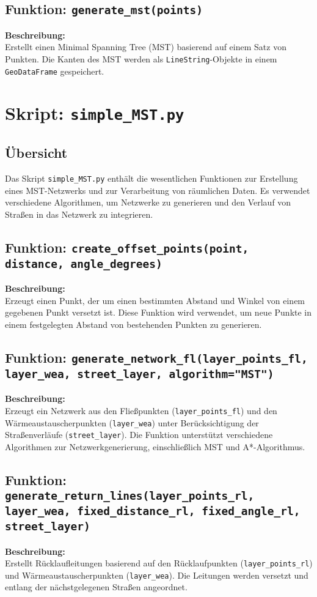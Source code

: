 \subsection{Funktion: \texttt{generate\_mst(points)}}
\textbf{Beschreibung:}\\
Erstellt einen Minimal Spanning Tree (MST) basierend auf einem Satz von Punkten. Die Kanten des MST werden als \texttt{LineString}-Objekte in einem \texttt{GeoDataFrame} gespeichert.

\section{Skript: \texttt{simple\_MST.py}}

\subsection{Übersicht}
Das Skript \texttt{simple\_MST.py} enthält die wesentlichen Funktionen zur Erstellung eines MST-Netzwerks und zur Verarbeitung von räumlichen Daten. Es verwendet verschiedene Algorithmen, um Netzwerke zu generieren und den Verlauf von Straßen in das Netzwerk zu integrieren.

\subsection{Funktion: \texttt{create\_offset\_points(point, distance, angle\_degrees)}}
\textbf{Beschreibung:}\\
Erzeugt einen Punkt, der um einen bestimmten Abstand und Winkel von einem gegebenen Punkt versetzt ist. Diese Funktion wird verwendet, um neue Punkte in einem festgelegten Abstand von bestehenden Punkten zu generieren.

\subsection{Funktion: \texttt{generate\_network\_fl(layer\_points\_fl, layer\_wea, street\_layer, algorithm="MST")}}
\textbf{Beschreibung:}\\
Erzeugt ein Netzwerk aus den Fließpunkten (\texttt{layer\_points\_fl}) und den Wärmeaustauscherpunkten (\texttt{layer\_wea}) unter Berücksichtigung der Straßenverläufe (\texttt{street\_layer}). Die Funktion unterstützt verschiedene Algorithmen zur Netzwerkgenerierung, einschließlich MST und A*-Algorithmus.

\subsection{Funktion: \texttt{generate\_return\_lines(layer\_points\_rl, layer\_wea, fixed\_distance\_rl, fixed\_angle\_rl, street\_layer)}}
\textbf{Beschreibung:}\\
Erstellt Rücklaufleitungen basierend auf den Rücklaufpunkten (\texttt{layer\_points\_rl}) und Wärmeaustauscherpunkten (\texttt{layer\_wea}). Die Leitungen werden versetzt und entlang der nächstgelegenen Straßen angeordnet.

